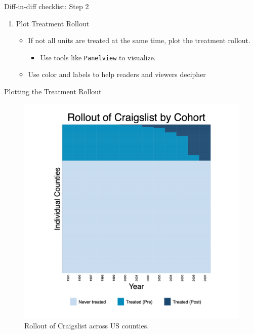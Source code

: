 \documentclass{beamer}
\begin{document}
\begin{frame}{Diff-in-diff checklist: Step 2}

\begin{enumerate}
\item[2. ] Plot Treatment Rollout
    \begin{itemize}
        \item If not all units are treated at the same time, plot the treatment rollout.
        \begin{itemize}
            \item Use tools like \texttt{Panelview} to visualize.
        \end{itemize}
        \item Use color and labels to help readers and viewers decipher
    \end{itemize}
   \end{enumerate}
\end{frame}





\begin{frame}{Plotting the Treatment Rollout}

\begin{figure}[ht]
    \centering
    \includegraphics[width=\linewidth, height=0.8\textheight, keepaspectratio]{./lecture_includes/rollout.png}
    \caption{Rollout of Craigslist across US counties.}
\end{figure}

\end{frame}
\end{document}
